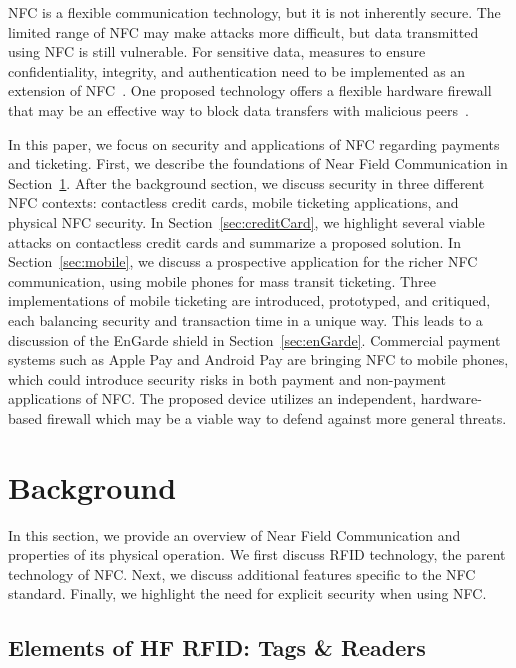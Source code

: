 \documentclass{sig-alternate}
\begin{document}
NFC is a flexible communication technology, but it is not inherently secure. The limited range of NFC may make attacks more difficult, but data transmitted using NFC is still vulnerable. For sensitive data, measures to ensure confidentiality, integrity, and authentication need to be implemented as an extension of NFC~\cite{CC2016}. One proposed technology offers a flexible hardware firewall that may be an effective way to block data transfers with malicious peers~\cite{Gum2013}.

In this paper, we focus on security and applications of NFC regarding payments and ticketing. First, we describe the foundations of Near Field Communication in Section~\ref{sec:background}. After the background section, we discuss security in three different NFC contexts: contactless credit cards, mobile ticketing applications, and physical NFC security.
In Section~\ref{sec:creditCard}, we highlight several viable attacks on
contactless credit cards and summarize a proposed solution.
In Section~\ref{sec:mobile}, we discuss a prospective application for the richer NFC communication, using mobile phones for mass transit ticketing. Three implementations of mobile ticketing are introduced, prototyped, and critiqued, each balancing security and transaction time in a unique way.
This leads to a discussion of the EnGarde shield in Section~\ref{sec:enGarde}. Commercial payment systems such as Apple Pay and Android Pay are bringing NFC to mobile phones, which could introduce security risks in both payment and non-payment applications of NFC. The proposed device utilizes an independent, hardware-based firewall which may be a viable way to defend against more general threats.


\section{Background}
\label{sec:background}
In this section, we provide an overview of Near Field Communication and properties of its physical operation.  We first discuss RFID technology, the parent technology of NFC. Next, we discuss additional features specific to the NFC standard.
Finally, we highlight the need for explicit security when using NFC.

\subsection{Elements of HF RFID: Tags \& Readers}
\label{sec:activePassive}
\end{document}
